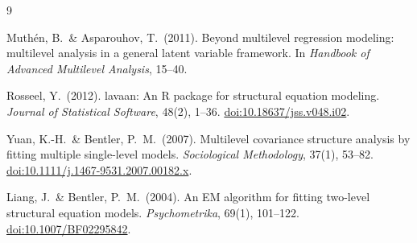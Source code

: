 \documentclass[11pt]{article}
\theoremstyle{plain}
\theoremstyle{remark}
\begin{document}
\begin{thebibliography}{9}

 Muth\'en, B.\ \& Asparouhov, T.\ (2011).
Beyond multilevel regression modeling: multilevel analysis in a general latent
variable framework. In \emph{Handbook of Advanced Multilevel Analysis}, 15--40.

 Rosseel, Y.\ (2012). lavaan: An R package for structural
equation modeling. \emph{Journal of Statistical Software}, 48(2), 1--36.
\href{https://doi.org/10.18637/jss.v048.i02}{doi:10.18637/jss.v048.i02}.

 Yuan, K.-H.\ \& Bentler, P.\ M.\ (2007). Multilevel
covariance structure analysis by fitting multiple single-level models.
\emph{Sociological Methodology}, 37(1), 53--82.
\href{https://doi.org/10.1111/j.1467-9531.2007.00182.x}{doi:10.1111/j.1467-9531.2007.00182.x}.

 Liang, J.\ \& Bentler, P.\ M.\ (2004). An EM
algorithm for fitting two-level structural equation models.
\emph{Psychometrika}, 69(1), 101--122.
\href{https://doi.org/10.1007/BF02295842}{doi:10.1007/BF02295842}.

\end{thebibliography}
\end{document}
